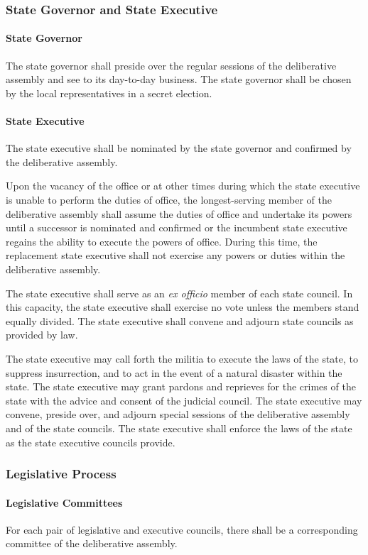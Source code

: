 \documentclass{article}
\begin{document}
\subsubsection{State Governor and State Executive}
\paragraph{State Governor}
The state governor shall preside over the regular sessions of the deliberative assembly and see to its day-to-day business. The state governor shall be chosen by the local representatives in a secret election.
\paragraph{State Executive}
The state executive shall be nominated by the state governor and confirmed by the deliberative assembly.

Upon the vacancy of the office or at other times during which the state executive is unable to perform the duties of office, the longest-serving member of the deliberative assembly shall assume the duties of office and undertake its powers until a successor is nominated and confirmed or the incumbent state executive regains the ability to execute the powers of office. During this time, the replacement state executive shall not exercise any powers or duties within the deliberative assembly.

The state executive shall serve as an \textit{ex officio} member of each state council. In this capacity, the state executive shall exercise no vote unless the members stand equally divided. The state executive shall convene and adjourn state councils as provided by law.

The state executive may call forth the militia to execute the laws of the state, to suppress insurrection, and to act in the event of a natural disaster within the state. The state executive may grant pardons and reprieves for the crimes of the state with the advice and consent of the judicial council. The state executive may convene, preside over, and adjourn special sessions of the deliberative assembly and of the state councils. The state executive shall enforce the laws of the state as the state executive councils provide.
\subsubsection{Legislative Process}
\paragraph{Legislative Committees}
For each pair of legislative and executive councils, there shall be a corresponding committee of the deliberative assembly.
\end{document}
